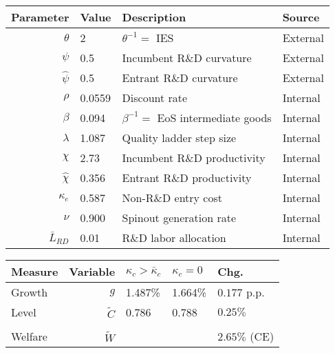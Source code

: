 \documentclass[11pt,english]{article}
\theoremstyle{definition}
\begin{document}
\begin{table}[]
	\centering
	\label{calibration_incumbentDRS_parameters}
	\begin{tabular}{rlll}
		\toprule \toprule
		Parameter & Value & Description & Source \tabularnewline
		\midrule
		$\theta$ & 2 & $\theta^{-1} = $ IES & External 
		\tabularnewline
		$\psi$ & 0.5 & Incumbent R\&D curvature & External \tabularnewline
		$\hat{\psi}$ & 0.5 & Entrant R\&D curvature & External \tabularnewline
		$\rho$ & 0.0559 & Discount rate  & Internal \tabularnewline
		$\beta$ & 0.094 & $\beta^{-1} = $ EoS intermediate goods & Internal \tabularnewline 
		$\lambda$ & 1.087 & Quality ladder step size & Internal 
		\tabularnewline
		$\chi$ & 2.73 & Incumbent R\&D productivity & Internal 
		\tabularnewline
		$\hat{\chi}$ & 0.356 & Entrant R\&D productivity & Internal \tabularnewline 
		$\kappa_e$ & 0.587 & Non-R\&D entry cost & Internal \tabularnewline
		$\nu$ & 0.900 & Spinout generation rate  & Internal\tabularnewline
		$\bar{L}_{RD}$ & 0.01 & R\&D labor allocation  & Internal \tabularnewline
		\bottomrule
	\end{tabular}
\end{table}

\begin{table}
	\centering
	\label{reducing_kappa_c_table_incumbentRDS}
	\begin{tabular}{lrlll}
		\toprule \toprule
		Measure & Variable & $\kappa_c > \bar{\kappa}_c$ & $\kappa_c = 0$ & Chg. \tabularnewline
		\midrule
		Growth & $g$ & 1.487\% & 1.664\% & $0.177$ p.p. \tabularnewline
		Level & $\tilde{C}$  & 0.786 &  0.788 & $0.25\%$ \tabularnewline 
		\tabularnewline
		Welfare & $\tilde{W}$  &  & & $2.65\%$ (CE)  \tabularnewline
		\bottomrule
	\end{tabular}
\end{table}
\end{document}
